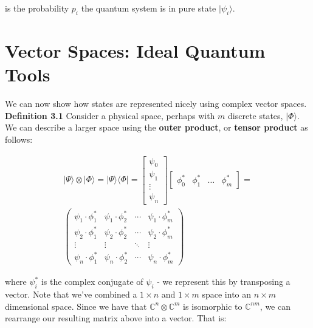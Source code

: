 \documentclass[letterpaper, 10 pt, conference]{ieeeconf}
\begin{document}
is the probability \( p_i \) the quantum system is in pure state \( |\psi_i\rangle \).

\section{Vector Spaces: Ideal Quantum Tools}

We can now show how states are represented nicely using complex vector spaces. \\

\textbf{Definition 3.1} Consider a physical space, perhaps with \(m\) discrete states, \( |\Phi\rangle \).  We can describe a larger space using the \textbf{outer product}, or \textbf{tensor product} as follows:

\begin{equation}
\begin{multlined}
|\Psi\rangle \otimes |\Phi\rangle = |\Psi\rangle \langle\Phi| =
\begin{bmatrix}\psi_0 \\ \psi_1 \\ \vdots \\ \psi_n \end{bmatrix}
\begin{bmatrix}\phi_0^* & \phi_1^* & \hdots & \phi_m^* \end{bmatrix} = \\
\begin{pmatrix}
\psi_1 \cdot \phi_1^* & \psi_1 \cdot \phi_2^* & \cdots & \psi_1 \cdot \phi_m^* \\
\psi_2 \cdot \phi_1^* & \psi_2 \cdot \phi_2^* & \cdots & \psi_2 \cdot \phi_m^* \\
\vdots  & \vdots  & \ddots & \vdots \\
\psi_n \cdot \phi_1^* & \psi_n \cdot \phi_2^* & \cdots & \psi_n \cdot \phi_m^*
\end{pmatrix}
\end{multlined}
\end{equation}

where \( \psi_i^* \) is the complex conjugate of \( \psi_i \) - we represent this by transposing a vector.  Note that we've combined a \( 1 \times n \) and \( 1 \times m \) space into an \( n \times m \) dimensional space.  Since we have that \( \mathbb{C}^n \otimes \mathbb{C}^m \) is isomorphic to \(  \mathbb{C}^{nm} \), we can rearrange our resulting matrix above into a vector.  That is:
\end{document}

